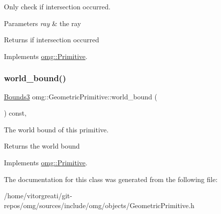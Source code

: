 Only check if intersection occurred. 


\begin{DoxyParams}{Parameters}
{\em ray} & the ray \\
\hline
\end{DoxyParams}
\begin{DoxyReturn}{Returns}
if intersection occurred 
\end{DoxyReturn}


Implements \mbox{\hyperlink{classomg_1_1_primitive_a139c012a57ad2322c5bef078b5d7e653}{omg\+::\+Primitive}}.

\mbox{\label{classomg_1_1_geometric_primitive_ae8f0945c180c43e32cad4faa75185522}} 
\subsubsection{\texorpdfstring{world\_bound()}{world\_bound()}}
{\footnotesize\ttfamily \mbox{\hyperlink{classomg_1_1_bounds3}{Bounds3}} omg\+::\+Geometric\+Primitive\+::world\+\_\+bound (\begin{DoxyParamCaption}{ }\end{DoxyParamCaption}) const\hspace{0.3cm}{\ttfamily [inline]}, {\ttfamily [virtual]}}



The world bound of this primitive. 

\begin{DoxyReturn}{Returns}
the world bound 
\end{DoxyReturn}


Implements \mbox{\hyperlink{classomg_1_1_primitive_a457b29547bc918cf8874b24f5168ff86}{omg\+::\+Primitive}}.



The documentation for this class was generated from the following file\+:\begin{DoxyCompactItemize}
\item 
/home/vitorgreati/git-\/repos/omg/sources/include/omg/objects/Geometric\+Primitive.\+h\end{DoxyCompactItemize}
